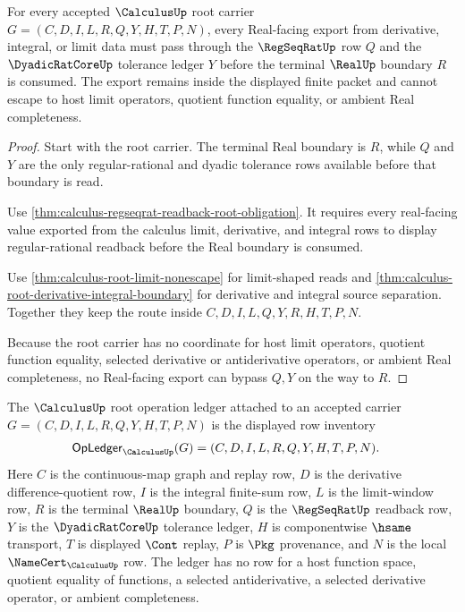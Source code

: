 \begin{theorem}
\label{thm:calculus-root-real-seal-nonescape}
For every accepted $\CalculusUp$ root carrier $G=(C,D,I,L,R,Q,Y,H,T,P,N)$, every Real-facing export from derivative, integral, or limit data must pass through the $\RegSeqRatUp$ row $Q$ and the $\DyadicRatCoreUp$ tolerance ledger $Y$ before the terminal $\RealUp$ boundary $R$ is consumed. The export remains inside the displayed finite packet and cannot escape to host limit operators, quotient function equality, or ambient Real completeness.
\end{theorem}
\begin{proof}
Start with the root carrier. The terminal Real boundary is $R$, while $Q$ and $Y$ are the only regular-rational and dyadic tolerance rows available before that boundary is read.

Use \autoref{thm:calculus-regseqrat-readback-root-obligation}. It requires every real-facing value exported from the calculus limit, derivative, and integral rows to display regular-rational readback before the Real boundary is consumed.

Use \autoref{thm:calculus-root-limit-nonescape} for limit-shaped reads and \autoref{thm:calculus-root-derivative-integral-boundary} for derivative and integral source separation. Together they keep the route inside $C,D,I,L,Q,Y,R,H,T,P,N$.

Because the root carrier has no coordinate for host limit operators, quotient function equality, selected derivative or antiderivative operators, or ambient Real completeness, no Real-facing export can bypass $Q,Y$ on the way to $R$.
\end{proof}

\begin{definition}
\label{def:calculus-root-operation-ledger}
The $\CalculusUp$ root operation ledger attached to an accepted carrier $G=(C,D,I,L,R,Q,Y,H,T,P,N)$ is the displayed row inventory
$$
\begin{aligned}
\mathsf{OpLedger}_{\CalculusUp}(G)=
(&C,D,I,L,R,Q,Y,H,T,P,N).
\end{aligned}
$$
Here $C$ is the continuous-map graph and replay row, $D$ is the derivative difference-quotient row, $I$ is the integral finite-sum row, $L$ is the limit-window row, $R$ is the terminal $\RealUp$ boundary, $Q$ is the $\RegSeqRatUp$ readback row, $Y$ is the $\DyadicRatCoreUp$ tolerance ledger, $H$ is componentwise $\hsame$ transport, $T$ is displayed $\Cont$ replay, $P$ is $\Pkg$ provenance, and $N$ is the local $\NameCert_{\CalculusUp}$ row. The ledger has no row for a host function space, quotient equality of functions, a selected antiderivative, a selected derivative operator, or ambient completeness.
\end{definition}

